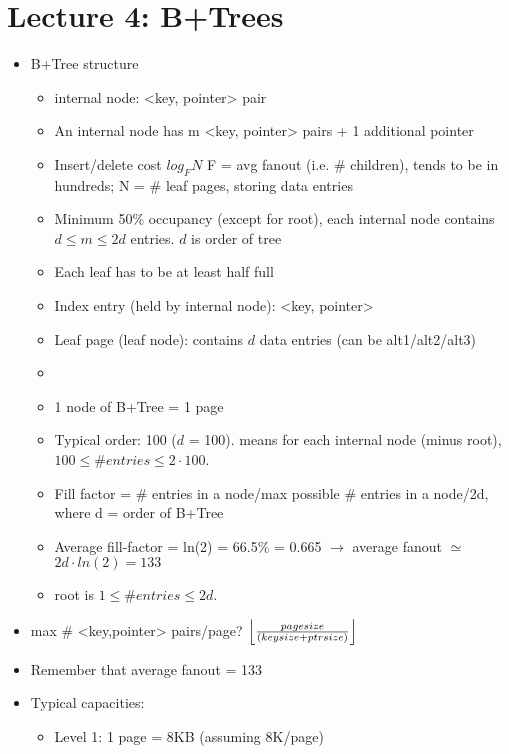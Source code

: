 \documentclass{article}
\DeclarePairedDelimiter\floor{\lfloor}{\rfloor}
\begin{document}
\section{Lecture 4: B+Trees}
\begin{itemize}
    \item B+Tree structure
        \begin{itemize}
            \item internal node: <key, pointer> pair
            \item An internal node has m <key, pointer> pairs + 1 additional pointer
            \item Insert/delete cost $log_{F}N$
                \subitem F = avg fanout (i.e. \# children), tends to be in hundreds; N = \# leaf pages, storing data entries
            \item Minimum 50\% occupancy (except for root), each internal node contains $d\leq m\leq 2d$ entries. $d$ is order of tree
            \item Each leaf has to be at least half full
            \item Index entry (held by internal node): <key, pointer>
            \item Leaf page (leaf node): contains $d$ data entries (can be alt1/alt2/alt3)
            \item  
            \item 1 node of B+Tree = 1 page
            \item Typical order: 100 ($d$ = 100). means for each internal node (minus root), $100\leq \#entries\leq 2\cdot 100$.
            \item Fill factor = \# entries in a node/max possible
                \subitem \# entries in a node/2d, where d = order of B+Tree
            \item Average fill-factor = ln(2) = 66.5\% = 0.665
                \subitem $\rightarrow$ average fanout $\simeq$ $2d \cdot ln(2) = 133$
            \item root is $1 \leq \#entries \leq 2d$.
        \end{itemize}
    \item max \# <key,pointer> pairs/page?
        \subitem $\floor*{\frac{pagesize}{(keysize + ptrsize)}}$
    \item Remember that average fanout = 133
    \item Typical capacities: 
        \begin{itemize}
            \item Level 1: 1 page = 8KB (assuming 8K/page)

\end{itemize}
\end{itemize}
\end{document}
